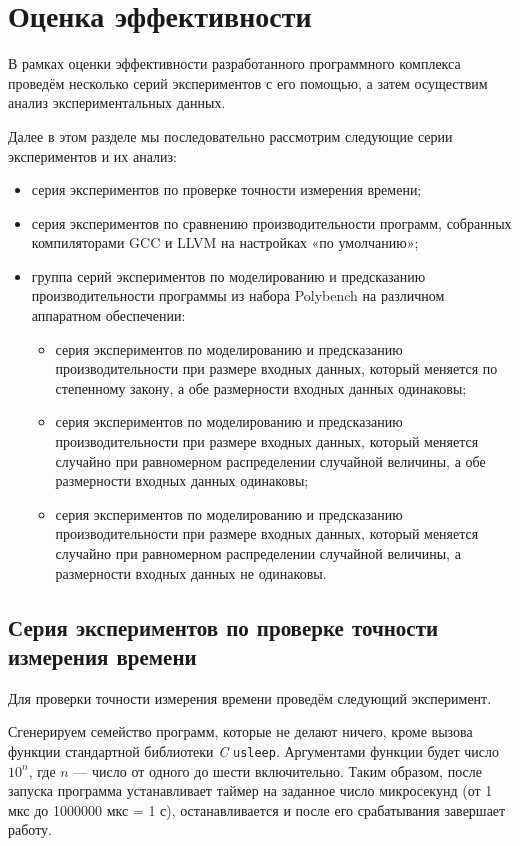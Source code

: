 \section{Оценка эффективности}
В рамках оценки эффективности разработанного программного комплекса проведём несколько серий экспериментов с его помощью, а затем осуществим анализ экспериментальных данных.

Далее в этом разделе мы последовательно рассмотрим следующие серии экспериментов и их анализ:
\begin{itemize}
    \item серия экспериментов по проверке точности измерения времени;
    \item серия экспериментов по сравнению производительности программ, собранных компиляторами GCC и LLVM на настройках «по умолчанию»;
    \item группа серий экспериментов по моделированию и предсказанию производительности программы из набора Polybench на различном аппаратном обеспечении:
    \begin{itemize}
        \item серия экспериментов по моделированию и предсказанию производительности при размере входных данных, который меняется по степенному закону, а обе размерности входных данных одинаковы;
        \item серия экспериментов по моделированию и предсказанию производительности при размере входных данных, который меняется случайно при равномерном распределении случайной величины, а обе размерности входных данных одинаковы;
        \item серия экспериментов по моделированию и предсказанию производительности при размере входных данных, который меняется случайно при равномерном распределении случайной величины, а размерности входных данных не одинаковы.
    \end{itemize}
\end{itemize}

\subsection{Серия экспериментов по проверке точности измерения времени}
\label{series-accuracy}
Для проверки точности измерения времени проведём следующий эксперимент.

Сгенерируем семейство программ, которые не делают ничего, кроме вызова функции стандартной библиотеки \textit{C} \texttt{usleep}. Аргументами функции будет число $10^n$, где $n$ --- число от одного до шести включительно. Таким образом, после запуска программа устанавливает таймер на заданное число микросекунд (от 1 мкс до 1000000 мкс = 1 с), останавливается и после его срабатывания завершает работу.

